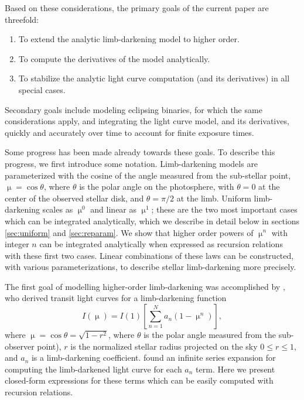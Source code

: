 \documentclass[modern]{aastex61}
\begin{document}
Based on these considerations, the primary goals of the current paper are
threefold:
\begin{enumerate}
\item To extend the analytic limb-darkening model to higher order.
\item To compute the derivatives of the model analytically.
\item To stabilize the analytic light curve computation (and its derivatives)
in all special cases.
\end{enumerate}
Secondary goals include modeling eclipsing binaries, for which the same
considerations apply, and integrating the light curve model, and its
derivatives, quickly and accurately over time to account for finite
exposure times.

Some progress has been made already towards these goals.  To describe this
progress, we first introduce some notation.  Limb-darkening models are
parameterized with the cosine of the angle measured from the sub-stellar point, 
$\upmu = \cos{\theta}$, where $\theta$ is the polar angle on the photosphere, 
with $\theta=0$ at the center of the observed stellar disk, and $\theta=\pi/2$ 
at the limb.  Uniform limb-darkening scales as $\upmu^0$ and linear as $\upmu^1$;
these are the two most important cases which can be integrated analytically, 
which we describe in detail below in sections \ref{sec:uniform} and 
\ref{sec:reparam}.  We show that higher order powers of $\upmu^n$ with integer 
$n$ can be integrated analytically when expressed as recursion relations with 
these first two cases.  Linear combinations of these laws can be constructed,
with various parameterizations, to describe stellar limb-darkening more precisely.

The first goal of modelling higher-order limb-darkening was accomplished
by \citet{Gimenez2006}, who derived transit light curves for a limb-darkening
function
\begin{equation}
I(\upmu) = I(1) \left[\sum_{n=1}^N a_n (1-\upmu^n) \right],
\end{equation}
where $\upmu = \cos{\theta} =\sqrt{1-r^2}$, where $\theta$ is the polar angle measured from the
sub-observer point), $r$ is the normalized stellar radius projected on the sky
$0\le r \le 1$, and $a_n$ is a limb-darkening coefficient.  \cite{Gimenez2006}
found an infinite series expansion for computing the limb-darkened light curve 
for each $a_n$ term.  Here we present closed-form expressions for these terms 
which can be easily computed with recursion relations.
\end{document}
